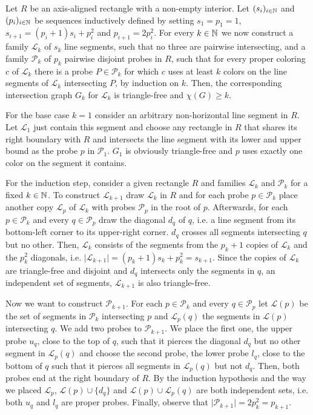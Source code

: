 \begin{prf}
Let $R$ be an axis-aligned rectangle with a non-empty interior. Let $(s_i)_{i\in\mathbb{N}}$ and $(p_i)_{i\in\mathbb{N}}$ be sequences inductively defined by setting $s_1=p_1=1$, $s_{i+1}=(p_i+1)s_i+p_i^2$ and $p_{i+1}=2p_i^2$. For every $k\in\mathbb{N}$ we now construct a family $\mathcal{L}_k$ of $s_k$ line segments, such that no three are pairwise intersecting, and a family $\mathcal{P}_k$ of $p_k$ pairwise disjoint probes in $R$, such that for every proper coloring $c$ of $\mathcal{L}_k$ there is a probe $P\in\mathcal{P}_k$ for which $c$ uses at least $k$ colors on the line segments of $\mathcal{L}_k$ intersecting $P$, by induction on $k$. Then, the corresponding intersection graph $G_k$ for $\mathcal{L}_k$ is triangle-free and $\chi (G)\geq k$.

For the base case $k=1$ consider an arbitrary non-horizontal line segment in $R$. Let $\mathcal{L}_1$ just contain this segment and choose any rectangle in $R$ that shares its right boundary with $R$ and intersects the line segment with its lower and upper bound as the probe $p$ in $\mathcal{P}_1$. $G_1$ is obviously triangle-free and $p$ uses exactly one color on the segment it contains.

For the induction step, consider a given rectangle $R$ and families $\mathcal{L}_k$ and $\mathcal{P}_k$ for a fixed $k\in\mathbb{N}$. To construct $\mathcal{L}_{k+1}$ draw $\mathcal{L}_k$ in $R$ and for each probe $p\in\mathcal{P}_k$ place another copy $\mathcal{L}_p$ of $\mathcal{L}_k$ with probes $\mathcal{P}_{p}$ in the root of $p$. Afterwards, for each $p\in\mathcal{P}_k$ and every $q\in\mathcal{P}_{p}$ draw the diagonal $d_q$ of $q$, i.e. a line segment from its bottom-left corner to its upper-right corner. $d_q$ crosses all segments intersecting $q$ but no other. Then, $\mathcal{L}_k$ consists of the segments from the $p_k + 1$ copies of $\mathcal{L}_k$ and the $p_k^2$ diagonals, i.e. $\vert \mathcal{L}_{k+1}\vert =(p_k + 1)s_k+p_k^2=s_{k+1}$. Since the copies of $\mathcal{L}_k$ are triangle-free and disjoint and $d_q$ intersects only the segments in $q$, an independent set of segments, $\mathcal{L}_{k+1}$ is also triangle-free.

Now we want to construct $\mathcal{P}_{k+1}$. For each $p\in\mathcal{P}_k$ and every $q\in\mathcal{P}_{p}$ let $\mathcal{L}(p)$ be the set of segments in $\mathcal{P}_k$ intersecting $p$ and $\mathcal{L}_p(q)$ the segments in $\mathcal{L}(p)$ intersecting $q$. We add two probes to $\mathcal{P}_{k+1}$. We place the first one, the upper probe $u_q$, close to the top of $q$, such that it pierces the diagonal $d_q$ but no other segment in $\mathcal{L}_p(q)$ and choose the second probe, the lower probe $l_q$, close to the bottom of $q$ such that it pierces all segments in $\mathcal{L}_p(q)$ but not $d_q$. Then, both probes end at the right boundary of $R$. By the induction hypothesis and the way we placed $\mathcal{L}_p$, $\mathcal{L}(p)\cup \lbrace d_q\rbrace$ and $\mathcal{L}(p)\cup\mathcal{L}_p(q)$ are both independent sets, i.e. both $u_q$ and $l_q$ are proper probes. Finally, observe that $\vert \mathcal{P}_{k+1}\vert = 2p_k^2=p_{k+1}$.


\end{prf}
